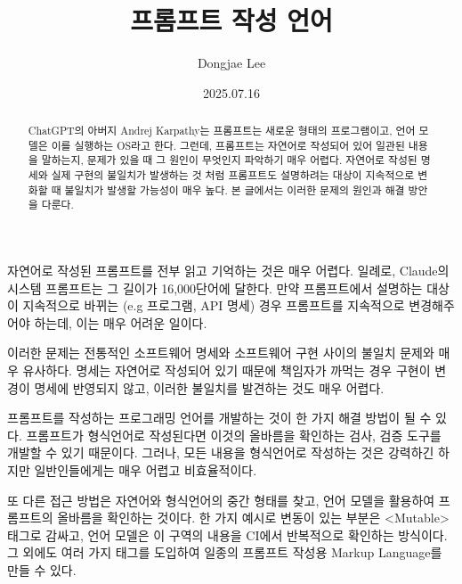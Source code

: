 \documentclass[11pt, oneside]{article}
\title{프롬프트 작성 언어}
\author{Dongjae Lee}
\date{2025.07.16}
\begin{document}
\maketitle

\begin{abstract}
	ChatGPT의 아버지 Andrej Karpathy는 프롬프트는 새로운 형태의 프로그램이고, 언어 모델은 이를 실행하는 OS라고 한다.
	그런데, 프롬프트는 자연어로 작성되어 있어 일관된 내용을 말하는지, 문제가 있을 때 그 원인이 무엇인지 파악하기 매우 어렵다.
	자연어로 작성된 명세와 실제 구현의 불일치가 발생하는 것 처럼 프롬프트도 설명하려는 대상이 지속적으로 변화할 때 불일치가 발생할 가능성이 매우 높다.
	본 글에서는 이러한 문제의 원인과 해결 방안을 다룬다.
\end{abstract}

자연어로 작성된 프롬프트를 전부 읽고 기억하는 것은 매우 어렵다. 일례로, Claude의 시스템 프롬프트는 그 길이가 16,000단어에 달한다.
만약 프롬프트에서 설명하는 대상이 지속적으로 바뀌는 (e.g 프로그램, API 명세) 경우 프롬프트를 지속적으로 변경해주어야 하는데, 이는 매우 어려운 일이다.

이러한 문제는 전통적인 소프트웨어 명세와 소프트웨어 구현 사이의 불일치 문제와 매우 유사하다.
명세는 자연어로 작성되어 있기 때문에 책임자가 까먹는 경우 구현이 변경이 명세에 반영되지 않고, 이러한 불일치를 발견하는 것도 매우 어렵다.

프롬프트를 작성하는 프로그래밍 언어를 개발하는 것이 한 가지 해결 방법이 될 수 있다.
프롬프트가 형식언어로 작성된다면 이것의 올바름을 확인하는 검사, 검증 도구를 개발할 수 있기 때문이다.
그러나, 모든 내용을 형식언어로 작성하는 것은 강력하긴 하지만 일반인들에게는 매우 어렵고 비효율적이다.

또 다른 접근 방법은 자연어와 형식언어의 중간 형태를 찾고, 언어 모델을 활용하여 프롬프트의 올바름을 확인하는 것이다.
한 가지 예시로 변동이 있는 부분은 <Mutable> 태그로 감싸고, 언어 모델은 이 구역의 내용을 CI에서 반복적으로 확인하는 방식이다.
그 외에도 여러 가지 태그를 도입하여 일종의 프롬프트 작성용 Markup Language를 만들 수 있다.
\end{document}
